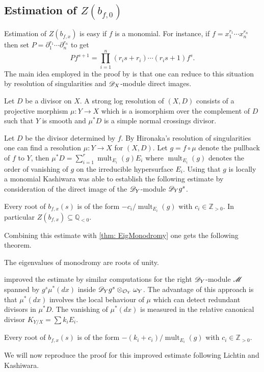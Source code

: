 \subsection{Estimation of $Z(b_{f,0})$}
Estimation of $Z(b_{f,x})$ is easy if $f$ is a monomial.
For instance, if $f = x_1^{r_1}\cdots x_n^{r_n}$ then set $P = \partial_1^{r_1}\cdots \partial_n^{r_n}$ to get
$$P f^{s+1} = \prod_{i=1}^n (r_i s + r_i)\cdots (r_i s + 1) f^{s}. $$
The main idea employed in the proof by \cite{kashiwara1976b} is that one can reduce to this situation by resolution of singularities and $\mathscr{D}_X$-module direct images.
\begin{definition}
  Let $D$ be a divisor on $X$. A strong log resolution of $(X,D)$ consists of a projective morphism $\mu:Y\to X$ which is a isomorphism over the complement of $D$ such that $Y$ is smooth and $\mu^*D$ is a simple normal crossings divisor.
\end{definition}
Let $D$ be the divisor determined by $f$.
By Hironaka's resolution of singularities one can find a resolution $\mu:Y\to X$ for $(X,D)$.
Let $g = f\circ \mu$ denote the pullback of $f$ to $Y$, then $\mu^*D = \sum_{i=1}^r \operatorname{mult}_{E_i}(g) E_i$ where $\operatorname{mult}_{E_i}(g)$ denotes the order of vanishing of $g$ on the irreducible hypersurface $E_i$.
Using that $g$ is locally a monomial Kashiwara was able to establish the following estimate by consideration of the direct image of the $\mathscr{D}_Y$-module $\mathscr{D}_Y g^s$.
\begin{theorem}{\cite{kashiwara1976b}}
  Every root of $b_{f,x}(s)$ is of the form $ -c_i/\operatorname{mult}_{E_i}(g) $ with $c_i\in \mathbb{Z}_{>0}$.
  In particular $Z(b_{f,x})\subseteq \mathbb{Q}_{<0}$.
\end{theorem}
Combining this estimate with \cref{thm: EigMonodromy} one gets the following theorem.
\begin{theorem}
  The eigenvalues of monodromy are roots of unity.
\end{theorem}
\cite{lichtin1989poles} improved the estimate by similar computations for the right $\mathscr{D}_Y$-module $\mathscr{M}$ spanned by $ g^s \mu^*(dx)$ inside $\mathscr{D}_Yg^s\otimes_{\mathcal{O}_Y} \omega_Y$.
The advantage of this approach is that $\mu^*(dx)$ involves the local behaviour of $\mu$ which can detect redundant divisors in $\mu^*D$.
The vanishing of $\mu^*(dx)$ is measured in the relative canonical divisor $K_{Y/X} = \sum k_i E_i$.
\begin{theorem}\label{thm: LichtinEstimate}
  Every root of $b_{f,x}(s)$ is of the form $-(k_i + c_i)/\operatorname{mult}_{E_i}(g)$ with $c_i\in \mathbb{Z}_{>0}$.
\end{theorem}
We will now reproduce the proof for this improved estimate following Lichtin and Kashiwara.
\\

